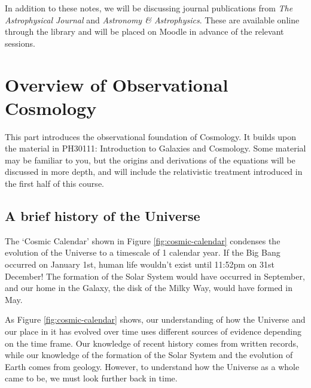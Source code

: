 \documentclass[]{book}
\begin{document}
In addition to these notes, we will be discussing journal publications
from \emph{The Astrophysical Journal} and \emph{Astronomy \& Astrophysics}. These
are available online through the library and will be placed on Moodle
in advance of the relevant sessions.

\hypertarget{ch:intro_obs}{%
\chapter{Overview of Observational Cosmology}\label{ch:intro_obs}}

This part introduces the observational foundation of Cosmology. It
builds upon the material in PH30111: Introduction to Galaxies and
Cosmology. Some material may be familiar to you, but the origins and
derivations of the equations will be discussed in more depth, and will
include the relativistic treatment introduced in the first half of this
course.

\hypertarget{sec:history}{%
\section{A brief history of the Universe}\label{sec:history}}

The `Cosmic Calendar' shown in
Figure \ref{fig:cosmic-calendar} condenses the evolution of the Universe
to a timescale of 1 calendar year. If the Big Bang occurred on January
1st, human life wouldn't exist until 11:52pm on 31st December! The
formation of the Solar System would have occurred in September, and our
home in the Galaxy, the disk of the Milky Way, would have formed in May.

As
Figure \ref{fig:cosmic-calendar} shows, our understanding of how the
Universe and our place in it has evolved over time uses different
sources of evidence depending on the time frame. Our knowledge of recent
history comes from written records, while our knowledge of the formation
of the Solar System and the evolution of Earth comes from geology.
However, to understand how the Universe as a whole came to be, we must
look further back in time.
\end{document}
